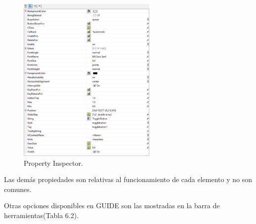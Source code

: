 \begin{figure}
\centering
\includegraphics[width=0.6\textwidth]{imagenes/figuras/6_3.png}
\caption{Property Inspector.}
\end{figure}

Las demás propiedades son relativas al funcionamiento de cada elemento y no son comunes.
\bigskip

Otras opciones disponibles en GUIDE son las mostradas en la barra de herramientas(Tabla 6.2).

